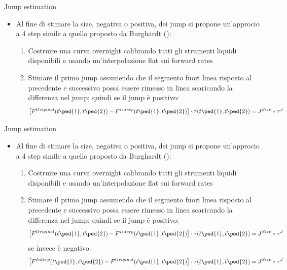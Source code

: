 \begin{tframe}{Jump estimation}
\begin{itemize}
\item Al fine di stimare la size, negativa o positiva, dei jump si propone un'approcio a 4 step simile a quello proposto da Burghardt (\cite{burgh}):
   \begin{enumerate}
   \item Costruire una curva overnight calibrando tutti gli strumenti liquidi disponibili e usando un'interpolazione flat sui forward rates
   \item Stimare il primo jump assumendo che il segmento fuori linea risposto al precedente e successivo possa essere rimesso in linea scaricando la differenza nel jump; quindi se il jump è positivo:
   $$\left[F^{Original}(t\ped{1},t\ped{2}) - F^{Interp}(t\ped{1},t\ped{2})\right] \cdot \tau(t\ped{1},t\ped{2}) = J^{Size}*\tau^{J}$$
   \end{enumerate}
\end{itemize}
\end{tframe}
\begin{tframe}{Jump estimation}
\begin{itemize}
\item Al fine di stimare la size, negativa o positiva, dei jump si propone un'approcio a 4 step simile a quello proposto da Burghardt (\cite{burgh}):
   \begin{enumerate}
   \item Costruire una curva overnight calibrando tutti gli strumenti liquidi disponibili e usando un'interpolazione flat sui forward rates
   \item Stimare il primo jump assumendo che il segmento fuori linea risposto al precedente e successivo possa essere rimesso in linea scaricando la differenza nel jump; quindi se il jump è positivo:
   $$\left[F^{Original}(t\ped{1},t\ped{2}) - F^{Interp}(t\ped{1},t\ped{2})\right] \cdot \tau(t\ped{1},t\ped{2}) = J^{Size}*\tau^{J}$$
   se invece è negativo:
   $$\left[F^{Interp}(t\ped{1},t\ped{2}) - F^{Original}(t\ped{1},t\ped{2})\right] \cdot \tau(t\ped{1},t\ped{2}) = J^{Size}*\tau^{J}$$
   \end{enumerate}
\end{itemize}
\end{tframe}
